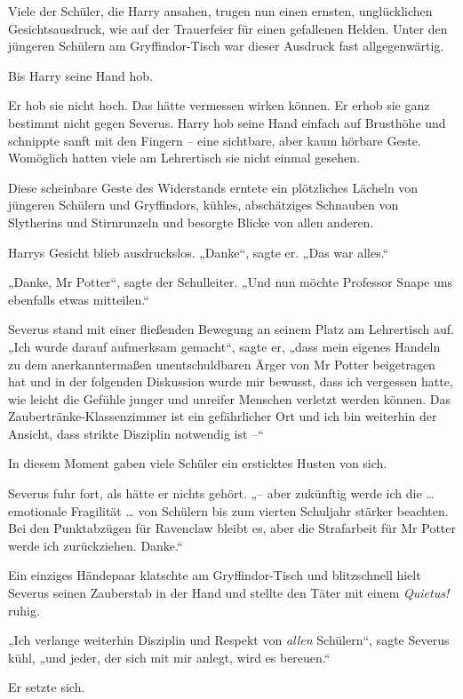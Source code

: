 {Viele der Schüler, die Harry ansahen, trugen nun einen ernsten, unglücklichen Gesichtsausdruck, wie auf der Trauerfeier für einen gefallenen Helden. Unter den jüngeren Schülern am Gryffindor-Tisch war dieser Ausdruck fast allgegenwärtig.

Bis Harry seine Hand hob.

Er hob sie nicht hoch. Das hätte vermessen wirken können. Er erhob sie ganz bestimmt nicht gegen Severus. Harry hob seine Hand einfach auf Brusthöhe und schnippte sanft mit den Fingern -- eine sichtbare, aber kaum hörbare Geste. Womöglich hatten viele am Lehrertisch sie nicht einmal gesehen.

Diese scheinbare Geste des Widerstands erntete ein plötzliches Lächeln von jüngeren Schülern und Gryffindors, kühles, abschätziges Schnauben von Slytherins und Stirnrunzeln und besorgte Blicke von allen anderen.

Harrys Gesicht blieb ausdruckslos. „Danke“, sagte er. „Das war alles.“

„Danke, Mr Potter“, sagte der Schulleiter. „Und nun möchte Professor Snape uns ebenfalls etwas mitteilen.“

Severus stand mit einer fließenden Bewegung an seinem Platz am Lehrertisch auf. „Ich wurde darauf aufmerksam gemacht“, sagte er, „dass mein eigenes Handeln zu dem anerkanntermaßen unentschuldbaren Ärger von Mr Potter beigetragen hat und in der folgenden Diskussion wurde mir bewusst, dass ich vergessen hatte, wie leicht die Gefühle junger und unreifer Menschen verletzt werden können. Das Zaubertränke-Klassenzimmer ist ein gefährlicher Ort und ich bin weiterhin der Ansicht, dass strikte Disziplin notwendig ist --“

In diesem Moment gaben viele Schüler ein ersticktes Husten von sich.

Severus fuhr fort, als hätte er nichts gehört. „-- aber zukünftig werde ich die … emotionale Fragilität … von Schülern bis zum vierten Schuljahr stärker beachten. Bei den Punktabzügen für Ravenclaw bleibt es, aber die Strafarbeit für Mr Potter werde ich zurückziehen. Danke.“

Ein einziges Händepaar klatschte am Gryffindor-Tisch und blitzschnell hielt Severus seinen Zauberstab in der Hand und stellte den Täter mit einem \emph{Quietus!} ruhig.

„Ich verlange weiterhin Disziplin und Respekt von \emph{allen} Schülern“, sagte Severus kühl, „und jeder, der sich mit mir anlegt, wird es bereuen.“

Er setzte sich.

}
